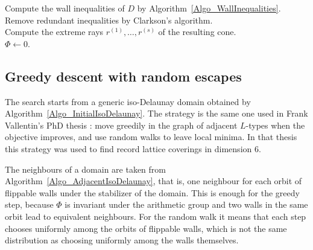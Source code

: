 \documentclass{amsart}
\newcommand{\rank}{\operatorname{rank}}
\begin{document}
\begin{algorithm}
Compute the wall inequalities of \(D\) by Algorithm~\ref{Algo_WallInequalities}.\\
Remove redundant inequalities by Clarkson's algorithm.\\
Compute the extreme rays \(r^{(1)},\ldots,r^{(s)}\) of the resulting cone.\\
\(\Phi\leftarrow 0\).\\
\For{\(i=1,\ldots,s\)}{
  \(R_i\leftarrow\sum_{u=1}^m r^{(i)}_u B_u\).\\
  \(\Phi\leftarrow \Phi+(n-\rank(R_i))\).
}
\KwRet{\(\Phi\)}
\caption{Rank-defect objective}
\label{Algo_RankDefect}
\end{algorithm}

\subsection{Greedy descent with random escapes}

The search starts from a generic iso-Delaunay domain obtained by
Algorithm~\ref{Algo_InitialIsoDelaunay}.  The strategy is the same one used
in Frank Vallentin's PhD thesis \cite{VallentinPhD}: move greedily in the
graph of adjacent \(L\)-types when the objective improves, and use random walks
to leave local minima.  In that thesis this strategy was used to find record
lattice coverings in dimension \(6\).

The neighbours of a domain are taken from
Algorithm~\ref{Algo_AdjacentIsoDelaunay}, that is, one neighbour for each
orbit of flippable walls under the stabilizer of the domain.  This is enough
for the greedy step, because \(\Phi\) is invariant under the arithmetic group
and two walls in the same orbit lead to equivalent neighbours.  For the random
walk it means that each step chooses uniformly among the orbits of flippable
walls, which is not the same distribution as choosing uniformly among the
walls themselves.
\end{document}
